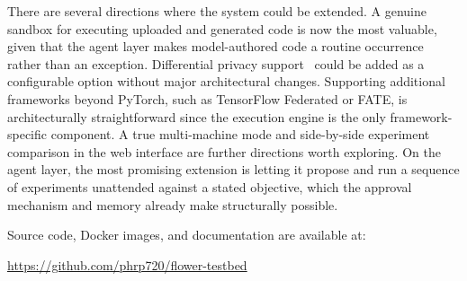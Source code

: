 \documentclass[conference]{IEEEtran}
\begin{document}
There are several directions where the system could be extended.
A genuine sandbox for executing uploaded and generated code is now the
most valuable, given that the agent layer makes model-authored code a
routine occurrence rather than an exception.
Differential privacy support~\cite{abadi2016deep} could be added as a
configurable option without major architectural changes.
Supporting additional frameworks beyond PyTorch, such as TensorFlow
Federated or FATE, is architecturally straightforward since the
execution engine is the only framework-specific component.
A true multi-machine mode and side-by-side experiment comparison in the
web interface are further directions worth exploring.
On the agent layer, the most promising extension is letting it propose
and run a sequence of experiments unattended against a stated objective,
which the approval mechanism and memory already make structurally
possible.

Source code, Docker images, and documentation are available at:
\begin{center}
  \url{https://github.com/phrp720/flower-testbed}
\end{center}



\end{document}
